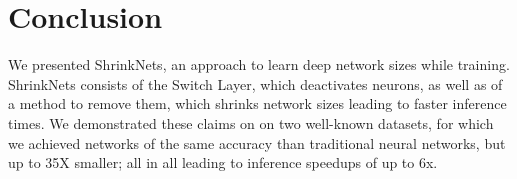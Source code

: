 \section{Conclusion}

We presented ShrinkNets, an approach to learn deep network sizes while training.
ShrinkNets consists of the Switch Layer, which deactivates neurons, as well as
of a method to remove them, which shrinks network sizes leading to faster
inference times. We demonstrated these claims on on two well-known datasets, for
which we achieved networks of the same accuracy than traditional neural
networks, but up to 35X smaller; all in all leading to inference speedups of up
to 6x.

